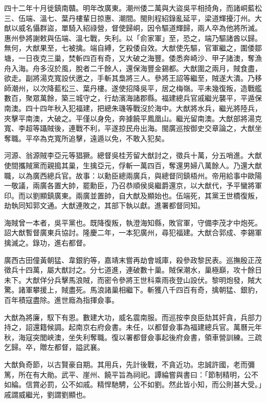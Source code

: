 \begin{pinyinscope}
四十二年十月徙鎮南贛。明年改廣東。潮州倭二萬與大盜吳平相掎角，而諸峒藍松三、伍端、溫七、葉丹樓輩日掠惠、潮間。閩則程紹錄亂延平，梁道輝擾汀州。大猷以威名懾群盜，單騎入紹祿營，督使歸峒，因令驅道輝歸，兩人卒為他將所滅。惠州參將謝敕與伍端、溫七戰，失利。以「俞家軍」至，恐之，端乃驅諸酋以歸。無何，大猷果至，七被擒。端自縛，乞殺倭自效。大猷使先驅，官軍繼之，圍倭鄒塘，一日夜克三巢，焚斬四百有奇，又大破之海豐。倭悉奔崎沙、甲子諸澳，奪漁舟入海。舟多沒於風，脫者二千餘人，還保海豐金錫都。大猷圍之兩月，賊食盡，欲走。副將湯克寬設伏邀之，手斬其梟將三人。參將王詔等繼至，賊遂大潰。乃移師潮州，以次降藍松三、葉丹樓。遂使招降吳平，居之梅嶺。平未幾復叛，造戰艦數百，聚眾萬餘，築三城守之，行劫濱海諸郡縣。福建總兵官戚繼光襲平，平遁保南澳。四十四年秋入犯福建，把總朱璣等戰沒於海中。大猷將水兵，繼光將陸兵，夾擊平南澳，大破之。平僅以身免，奔據饒平鳳凰山。繼光留南澳。大猷部將湯克寬、李超等躡賊後，連戰不利，平遂掠民舟出海。閩廣巡按御史交章論之，大猷坐奪職。平卒為克寬所追擊，遠遁以免，不敢入犯矣。

河源、翁源賊李亞元等猖獗。總督吳桂芳留大猷討之，徵兵十萬，分五哨進。大猷使間攜賊黨而親搗其巢，生擒亞元，俘斬一萬四百，奪還男婦八萬餘人。乃還大猷職，以為廣西總兵官。故事：以勳臣總兩廣兵，與總督同鎮梧州。帝用給事中歐陽一敬議，兩廣各置大帥，罷勳臣，乃召恭順侯吳繼爵還京，以大猷代，予平蠻將軍印。而以劉顯鎮廣東。兩廣並置帥，自大猷及顯始也。伍端死，其黨王世橋復叛，劫執同知郭文通。大猷連敗之，其部下執以獻。進署都督同知。

海賊曾一本者，吳平黨也。既降復叛，執澄海知縣，敗官軍，守備李茂才中炮死。詔大猷暫督廣東兵協討。隆慶二年，一本犯廣州，尋犯福建。大猷合郭成、李錫軍擒滅之。錄功，進右都督。

廣西古田僮黃朝猛、韋銀豹等，嘉靖末嘗再劫會城庫，殺參政黎民表。巡撫殷正茂徵兵十四萬，屬大猷討之。分七道進，連破數十巢。賊保潮水，巢極巔，攻十餘日未下。大猷佯分兵擊馬浪賊，而密令參將王世科乘雨夜登山設伏。黎明炮發，賊大驚。諸軍攀援上，賊盡死。馬浪諸巢相繼下。斬獲八千四百有奇，擒朝猛、銀豹，百年積寇盡除。進世廕為指揮僉事。

大猷為將廉，馭下有恩。數建大功，威名震南服。而巡按李良臣劾其奸貪，兵部力持之，詔還籍候調。起南京右府僉書。未任，以都督僉事為福建總兵官。萬曆元年秋，海寇突閭峽澳，坐失利奪職。復以署都督僉事起後府僉書，領車營訓練。三疏乞歸。卒，贈左都督，謚武襄。

大猷負奇節，以古賢豪自期。其用兵，先計後戰，不貪近功。忠誠許國，老而彌篤，所在有大勛。武平、崖州、饒平旨為祠祀。譚綸嘗與書曰：「節制精明，公不如綸。信賞必罰，公不如戚。精悍馳騁，公不如劉。然此皆小知，而公則甚大受。」戚謂威繼光，劉謂劉顯也。


\end{pinyinscope}
